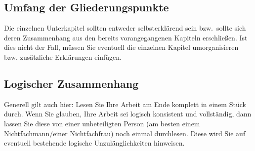 \subsection{Umfang der Gliederungspunkte}
Die einzelnen Unterkapitel sollten entweder selbsterklärend sein bzw.~sollte sich deren Zusammenhang aus den bereits vorangegangenen Kapiteln erschließen.
Ist dies nicht der Fall, müssen Sie eventuell die einzelnen Kapitel umorganisieren bzw. zusätzliche Erklärungen einfügen.

\subsection{Logischer Zusammenhang}
Generell gilt auch hier: Lesen Sie Ihre Arbeit am Ende komplett in einem Stück durch.
Wenn Sie glauben, Ihre Arbeit sei logisch konsistent und vollständig, dann lassen Sie diese von einer unbeteiligten Person (am besten einem Nichtfachmann/einer Nichtfachfrau) noch einmal durchlesen.
Diese wird Sie auf eventuell bestehende logische Unzulänglichkeiten hinweisen.
